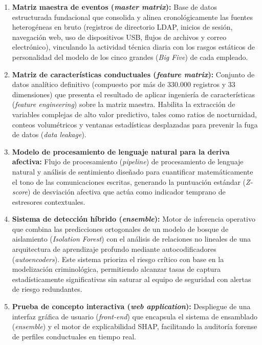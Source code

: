 \documentclass[IB]{TFUOC}%
\begin{document}
\begin{enumerate}
    \item \textbf{Matriz maestra de eventos (\textit{master matrix}):}\newline
    Base de datos estructurada fundacional que consolida y alinea cronológicamente las fuentes heterogéneas en bruto (registros de directorio LDAP, inicios de sesión, navegación web, uso de dispositivos USB, flujos de archivos y correo electrónico), vinculando la actividad técnica diaria con los rasgos estáticos de personalidad del modelo de los cinco grandes (\textit{Big Five}) de cada empleado.

    \item \textbf{Matriz de características conductuales (\textit{feature matrix}):}\newline
    Conjunto de datos analítico definitivo (compuesto por más de 330.000 registros y 33 dimensiones) que presenta el resultado de aplicar ingeniería de características (\textit{feature engineering}) sobre la matriz maestra. Habilita la extracción de variables complejas de alto valor predictivo, tales como ratios de nocturnidad, conteos volumétricos y ventanas estadísticas desplazadas para prevenir la fuga de datos (\textit{data leakage}).

    \item \textbf{Modelo de procesamiento de lenguaje natural para la deriva afectiva:}\newline
    Flujo de procesamiento (\textit{pipeline}) de procesamiento de lenguaje natural y análisis de sentimiento diseñado para cuantificar matemáticamente el tono de las comunicaciones escritas, generando la puntuación estándar (\textit{Z-score}) de desviación afectiva que actúa como indicador temprano de estresores contextuales.

    \item \textbf{Sistema de detección híbrido (\textit{ensemble}):}\newline
    Motor de inferencia operativo que combina las predicciones ortogonales de un modelo de bosque de aislamiento (\textit{Isolation Forest}) con el análisis de relaciones no lineales de una arquitectura de aprendizaje profundo mediante autocodificadores (\textit{autoencoders}). Este sistema prioriza el riesgo crítico con base en la modelización criminológica, permitiendo alcanzar tasas de captura estadísticamente significativas sin saturar al equipo de seguridad con alertas de riesgo redundantes.

    \item \textbf{Prueba de concepto interactiva (\textit{web application}):}\newline
    Despliegue de una interfaz gráfica de usuario (\textit{front-end}) que encapsula el sistema de ensamblado (\textit{ensemble}) y el motor de explicabilidad SHAP, facilitando la auditoría forense de perfiles conductuales en tiempo real.


\end{enumerate}
\end{document}

